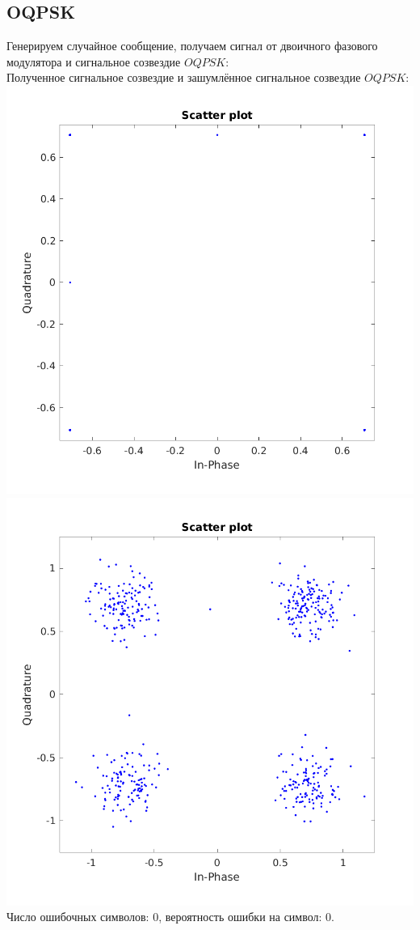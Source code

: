\documentclass[a4paper]{article}
\begin{document}
\subsection{OQPSK}
Генерируем случайное сообщение, получаем сигнал от двоичного фазового модулятора и сигнальное созвездие $OQPSK$:
\\
Полученное сигнальное созвездие и зашумлённое сигнальное созвездие $OQPSK$:\\
\includegraphics[scale=0.4]{lab6/figures/figure_4.png}
\includegraphics[scale=0.4]{lab6/figures/figure_5.png}\\
Число ошибочных символов: 0, вероятность ошибки на символ: 0.
\end{document}
